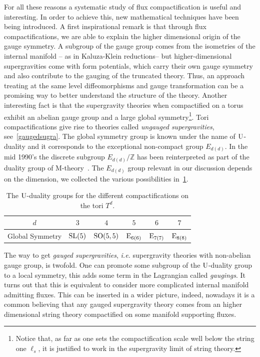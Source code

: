 \documentclass[draft]{phd}
\begin{document}
			For all these reasons a systematic study of flux compactification is useful and interesting.
			In order to achieve this, new mathematical techniques have been being introduced.
			A first inspirational remark is that through flux compactifications, we are able to explain the higher dimensional origin of the gauge symmetry.
			A subgroup of the gauge group comes from the isometries of the internal manifold -- as in Kaluza-Klein reductions-- but higher-dimensional supergravities come with form potentials, which carry their own gauge symmetry and also contribute to the gauging of the truncated theory.
			Thus, an approach treating at the same level diffeomorphisms and gauge transformation can be a promising way to better understand the structure of the theory.
			Another interesting fact is that the supergravity theories when compactified on a torus exhibit an abelian gauge group and a large global symmetry\footnote{
				Notice that, as far as one sets the compactification scale well below the string one $\ell_s$, it is justified to work in the supergravity limit of string theory.}.
			Tori compactifications give rise to theories called \emph{ungauged supergravities}, see~\cref{gaugedsugra}.
			The global symmetry group is known under the name of $\mathrm{U}$-duality and it corresponds to the exceptional non-compact group $E_{d(d)}$.
			In the mid 1990's the discrete subgroup $E_{d(d)}/\mathbb{Z}$ has been reinterpreted as part of the duality group of M-theory~\cite{hulldualities}.  
			The $E_{d(d)}$ group relevant in our discussion depends on the dimension, we collected the various possibilities in~\cref{Udualtab}.
							\begin{table}[h!]
							\centering
								\begin{tabular}{c c c c c c}
									$d$					&		$3$			&		$4$			&		$5$		&		$6$		&		$7$		\\
										\midrule
									Global Symmetry		&	$\mathrm{SL}(5)$	& 	$\mathrm{SO}(5,5)$	&	$\mathrm{E}_{6(6)}$	&	$\mathrm{E}_{7(7)}$	&	$\mathrm{E}_{8(8)}$	
								\end{tabular}
								\caption{The $\mathrm{U}$-duality groups for the different compactifications on the tori $T^d$.}
								\label{Udualtab}
							\end{table}
			
			The way to get \emph{gauged supergravities}, \emph{i.e.} supergravity theories with non-abelian gauge group, is twofold.
			One can promote some subgroup of the $\mathrm{U}$-duality group to a local symmetry, this adds some term in the Lagrangian called \emph{gaugings}.
			It turns out that this is equivalent to consider more complicated internal manifold admitting fluxes.
			This can be inserted in a wider picture, indeed, nowadays it is a common believing that any gauged supergravity theory comes from an higher dimensional string theory compactified on some manifold supporting fluxes.
			
\end{document}
